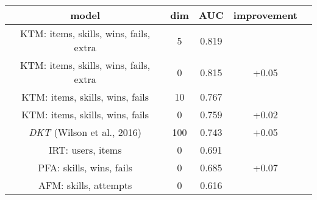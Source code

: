 \begin{tabular}{ccccc}
\toprule
                      model &  dim &             AUC & improvement\\
\midrule
 KTM: items, skills, wins, fails, extra &  5 &  0.819 & \\
 KTM: items, skills, wins, fails, extra &  0 &  0.815 & +0.05 \\
 KTM: items, skills, wins, fails &  10 &  0.767 & \\
 KTM: items, skills, wins, fails &  0 &  0.759 & +0.02 \\
 \emph{DKT} (Wilson et al., 2016) &  100 & 0.743 & +0.05 \\
 IRT: users, items &  0 &  0.691 & \\
 PFA: skills, wins, fails &  0 &  0.685 & +0.07 \\
 AFM: skills, attempts &  0 &  0.616 &\\ \bottomrule
\end{tabular}
